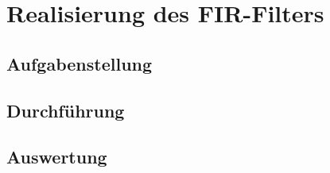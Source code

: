 \chapter{Realisierung des FIR-Filters}\label{Cha:RealFIR}
\section{Aufgabenstellung}
\section{Durchf\"uhrung}
\section{Auswertung}

